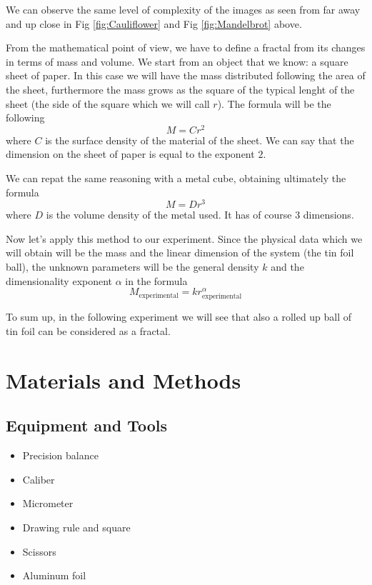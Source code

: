 \documentclass[a4paper,12pt]{article}
\begin{document}
\par We can observe the same level of complexity of the images as seen from far away 
and up close in Fig \ref{fig:Cauliflower} and Fig \ref{fig:Mandelbrot} above.

\par From the mathematical point of view, we have to define a fractal from its changes 
in terms of mass and volume. We start from an object that we know: a square sheet 
of paper. In this case we will have the mass distributed following the area of 
the sheet, furthermore the mass grows as the square of the typical lenght of the 
sheet (the side of the square which we will call $r$). The formula will be the 
following 
\[ M = C r^2 \]
where $C$ is the surface density of the material of the sheet. We can say that the 
dimension on the sheet of paper is equal to the exponent $2$.

We can repat the same reasoning with a metal cube, obtaining ultimately the formula
\[ M = D r^3 \]
where $D$ is the volume density of the metal used. It has of course $3$ dimensions.

\par Now let's apply this method to our experiment. Since the physical data which we 
will obtain will be the mass and the linear dimension of the system 
(the tin foil ball), the unknown parameters will be the general density $k$ and 
the dimensionality exponent $\alpha$ in the formula
\begin{equation} 
    M_{\text{experimental}} = k r_{\text{experimental}}^{\alpha}
    \label{eq:gen_fractal}
\end{equation}   

To sum up, in the following experiment we will see that also a rolled up ball of 
tin foil can be considered as a fractal.


\section{Materials and Methods}
\subsection{Equipment and Tools}
\begin{itemize}
    \item Precision balance
    \item Caliber
    \item Micrometer
    \item Drawing rule and square
    \item Scissors
    \item Aluminum foil
\end{itemize}
\end{document}
